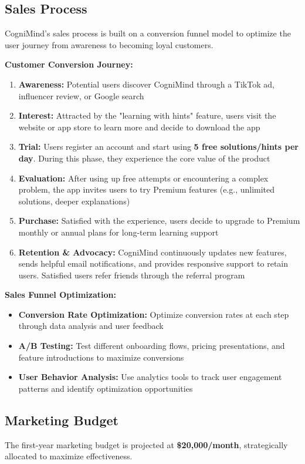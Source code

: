 \subsection{Sales Process}
CogniMind's sales process is built on a conversion funnel model to optimize the user journey from awareness to becoming loyal customers.

\textbf{Customer Conversion Journey:}
\begin{enumerate}
    \item \textbf{Awareness:} Potential users discover CogniMind through a TikTok ad, influencer review, or Google search
    \item \textbf{Interest:} Attracted by the "learning with hints" feature, users visit the website or app store to learn more and decide to download the app
    \item \textbf{Trial:} Users register an account and start using \textbf{5 free solutions/hints per day}. During this phase, they experience the core value of the product
    \item \textbf{Evaluation:} After using up free attempts or encountering a complex problem, the app invites users to try Premium features (e.g., unlimited solutions, deeper explanations)
    \item \textbf{Purchase:} Satisfied with the experience, users decide to upgrade to Premium monthly or annual plans for long-term learning support
    \item \textbf{Retention \& Advocacy:} CogniMind continuously updates new features, sends helpful email notifications, and provides responsive support to retain users. Satisfied users refer friends through the referral program
\end{enumerate}

\textbf{Sales Funnel Optimization:}
\begin{itemize}
    \item \textbf{Conversion Rate Optimization:} Optimize conversion rates at each step through data analysis and user feedback
    \item \textbf{A/B Testing:} Test different onboarding flows, pricing presentations, and feature introductions to maximize conversions
    \item \textbf{User Behavior Analysis:} Use analytics tools to track user engagement patterns and identify optimization opportunities
\end{itemize}

\subsection{Marketing Budget}
The first-year marketing budget is projected at \textbf{\$20,000/month}, strategically allocated to maximize effectiveness.


